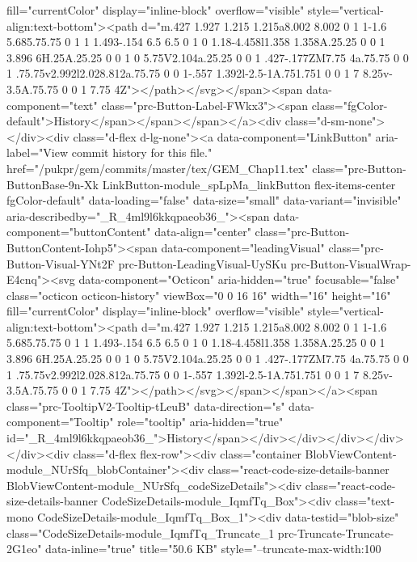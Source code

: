 fill="currentColor" display="inline-block" overflow="visible" style="vertical-align:text-bottom"><path d="m.427 1.927 1.215 1.215a8.002 8.002 0 1 1-1.6 5.685.75.75 0 1 1 1.493-.154 6.5 6.5 0 1 0 1.18-4.458l1.358 1.358A.25.25 0 0 1 3.896 6H.25A.25.25 0 0 1 0 5.75V2.104a.25.25 0 0 1 .427-.177ZM7.75 4a.75.75 0 0 1 .75.75v2.992l2.028.812a.75.75 0 0 1-.557 1.392l-2.5-1A.751.751 0 0 1 7 8.25v-3.5A.75.75 0 0 1 7.75 4Z"></path></svg></span><span data-component="text" class="prc-Button-Label-FWkx3"><span class="fgColor-default">History</span></span></span></a><div class="d-sm-none"></div><div class="d-flex d-lg-none"><a data-component="LinkButton" aria-label="View commit history for this file." href="/pukpr/gem/commits/master/tex/GEM_Chap11.tex" class="prc-Button-ButtonBase-9n-Xk LinkButton-module_spLpMa_linkButton flex-items-center fgColor-default" data-loading="false" data-size="small" data-variant="invisible" aria-describedby="_R_4ml9l6kkqpaeob36_"><span data-component="buttonContent" data-align="center" class="prc-Button-ButtonContent-Iohp5"><span data-component="leadingVisual" class="prc-Button-Visual-YNt2F prc-Button-LeadingVisual-UySKu prc-Button-VisualWrap-E4cnq"><svg data-component="Octicon" aria-hidden="true" focusable="false" class="octicon octicon-history" viewBox="0 0 16 16" width="16" height="16" fill="currentColor" display="inline-block" overflow="visible" style="vertical-align:text-bottom"><path d="m.427 1.927 1.215 1.215a8.002 8.002 0 1 1-1.6 5.685.75.75 0 1 1 1.493-.154 6.5 6.5 0 1 0 1.18-4.458l1.358 1.358A.25.25 0 0 1 3.896 6H.25A.25.25 0 0 1 0 5.75V2.104a.25.25 0 0 1 .427-.177ZM7.75 4a.75.75 0 0 1 .75.75v2.992l2.028.812a.75.75 0 0 1-.557 1.392l-2.5-1A.751.751 0 0 1 7 8.25v-3.5A.75.75 0 0 1 7.75 4Z"></path></svg></span></span></a><span class="prc-TooltipV2-Tooltip-tLeuB" data-direction="s" data-component="Tooltip" role="tooltip" aria-hidden="true" id="_R_4ml9l6kkqpaeob36_">History</span></div></div></div></div></div><div class="d-flex flex-row"><div class="container BlobViewContent-module_NUrSfq_blobContainer"><div class="react-code-size-details-banner BlobViewContent-module_NUrSfq_codeSizeDetails"><div class="react-code-size-details-banner CodeSizeDetails-module_IqmfTq_Box"><div class="text-mono CodeSizeDetails-module_IqmfTq_Box_1"><div data-testid="blob-size" class="CodeSizeDetails-module_IqmfTq_Truncate_1 prc-Truncate-Truncate-2G1eo" data-inline="true" title="50.6 KB" style="--truncate-max-width:100%